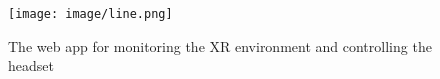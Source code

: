 \begin{figure}[h!]
    \centering
    \texttt{[image: image/line.png]}
    \caption{The web app for monitoring the XR environment and controlling the headset}
    \label{fig:line}
\end{figure}